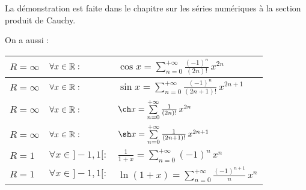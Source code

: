 \documentclass{book}
\begin{document}
\begin{Demonstration}
La démonstration est faite dans le chapitre sur les séries numériques à la section produit de Cauchy.
\end{Demonstration}
On a aussi :\\
\begin{tabular}{l|ll}
$R=\infty$ & $\forall x \in\mathbb{R}:$& $\cos x  = \sum\limits_{n=0}^{+\infty} \frac{(-1)^n}{(2n)!} \, x^{2n}$\\ \hline
$R=\infty$ & $\forall x \in\mathbb{R}:$&$\sin x  =  \sum\limits_{n=0}^{+\infty} \frac{(-1)^n}{(2n+1)!} \, x^{2n+1}$\\ \hline
$R=\infty$ & $\forall x \in\mathbb{R}: $&$\ch x =  \sum\limits_{n=0}^{+\infty} \frac{1}{(2n)!} \, x^{2n}$\\ \hline
$R=\infty$ & $\forall x \in\mathbb{R}:$&$ \sh x =  \sum\limits_{n=0}^{+\infty} \frac{1}{(2n+1)!} \, x^{2n+1}$\\ \hline
$R=1$ & $\forall x \in]-1,1[:$&$ \frac{1}{1+x} = \sum\limits_{n=0}^{+\infty} (-1)^n \, x^{n}$\\ \hline
$R=1$ & $\forall x \in]-1,1[:$&$ \ln(1+x) =  \sum\limits_{n=0}^{+\infty} \frac{(-1)^{n+1}}{n} \, x^{n}$
\end{tabular}
\end{document}
